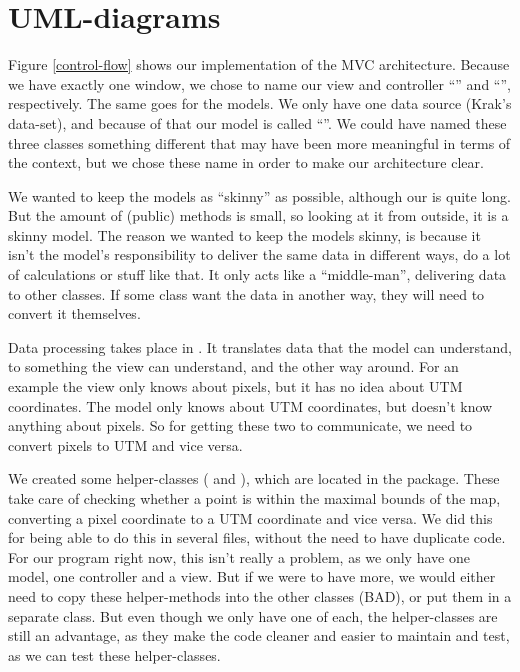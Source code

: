 \chapter{UML-diagrams}
\label{UML}

Figure \ref{control-flow} shows our implementation of the MVC architecture.
Because we have exactly one window, we chose to name our view and controller ``'' and 
``'', respectively. The same goes for the models. We only have one data 
source (Krak's data-set), and because of that our model is called ``''. We could 
have named these three classes something different that may have been more meaningful 
in terms of the  context, but we chose these name in order to make 
our architecture clear.

We wanted to keep the models as ``skinny'' as possible, 
although our  is quite long. But the amount of (public) methods is small, so 
looking at it from outside, it is a skinny model. The reason we wanted to keep the models 
skinny, is because it isn't the model's responsibility to deliver the same data in different ways, 
do a lot of calculations or stuff like that. It only acts like a ``middle-man'', delivering data to 
other classes. If some class want the data in another way, they will need to convert it 
themselves.

Data processing takes place in . It translates data that the model can 
understand, to something the view can understand, and the other way around. For 
an example the view only knows about pixels, but it has no idea about UTM 
coordinates. The model only knows about UTM coordinates, but doesn't know anything 
about pixels. So for getting these two to communicate, we need to convert pixels to 
UTM and vice versa.

We created some helper-classes ( and ), 
which are located in the  package. These take care of checking whether a point 
is within the maximal bounds of the map, converting a pixel coordinate to a UTM coordinate 
and vice versa. We did this for being able to do this in several files, without the need to have 
duplicate code. For our program right now, this isn't really a problem, as we only have one 
model, one controller and a view. But if we were to have more, we would either need to copy 
these helper-methods into the other classes (BAD), or put them in a separate class. But even 
though we only have one of each, the helper-classes are still an advantage, as they make the 
code cleaner and easier to maintain and test, as we can test these helper-classes.

